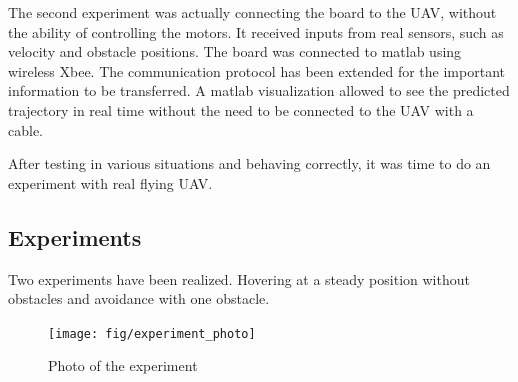 \documentclass[a4paper,11pt,titlepage]{article}
\begin{document}
The second experiment was actually connecting the board to the UAV, without the ability of controlling the motors. It received inputs from real sensors, such as velocity and obstacle positions. The board was connected to matlab using wireless Xbee. The communication protocol has been extended for the important information to be transferred. A matlab visualization allowed to see the predicted trajectory in real time without the need to be connected to the UAV with a cable. 

After testing in various situations and behaving correctly, it was time to do an experiment with real flying UAV.

\subsection{Experiments}

Two experiments have been realized. Hovering at a steady position without obstacles and avoidance with one obstacle.

\begin{figure}[h]
\begin{center}
\texttt{[image: fig/experiment\_photo]}
\caption{Photo of the experiment}
\label{fig:move_blocking}
\end{center}
\end{figure}
\end{document}

